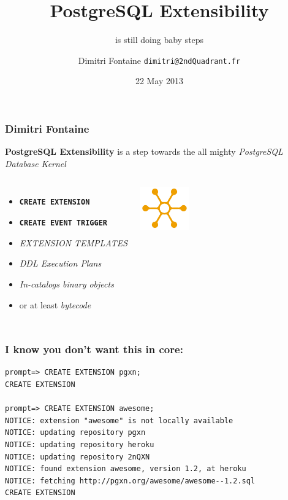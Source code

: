 \documentclass[english]{beamer}
\title{PostgreSQL Extensibility}
\subtitle{is still doing baby steps}
\author{Dimitri Fontaine \newline\tiny{\texttt{dimitri@2ndQuadrant.fr}}}
\date{22 May 2013}
\begin{document}
\frame{\titlepage}

\begin{frame}[fragile]
  \frametitle{Dimitri Fontaine}

  \begin{center}
    \textbf{PostgreSQL Extensibility}
    \vfill
    is a step towards the all mighty \textit{PostgreSQL Database Kernel}
  \end{center}
  \vfill

\begin{columns}[c]

  \begin{itemize}
   \item<1-> \texttt{\textbf{CREATE EXTENSION}}
   \item<1-> \texttt{\textbf{CREATE EVENT TRIGGER}}
   \item<2-> \textit{EXTENSION TEMPLATES}
   \item<3-> \textit{DDL Execution Plans}
   \item<4-> \textit{In-catalogs binary objects}
   \item<4-> or at least \textit{bytecode}
  \end{itemize}  

\begin{center}
  \includegraphics[height=5em]{distribution.jpg}
\end{center}
\end{columns}
\end{frame}

\begin{frame}[fragile]
  \frametitle{I know you don't want this in core:}

\begin{verbatim}
prompt=> CREATE EXTENSION pgxn;
CREATE EXTENSION

prompt=> CREATE EXTENSION awesome;
NOTICE: extension "awesome" is not locally available
NOTICE: updating repository pgxn
NOTICE: updating repository heroku
NOTICE: updating repository 2nQXN
NOTICE: found extension awesome, version 1.2, at heroku
NOTICE: fetching http://pgxn.org/awesome/awesome--1.2.sql
CREATE EXTENSION
\end{verbatim}
\end{frame}
\end{document}
